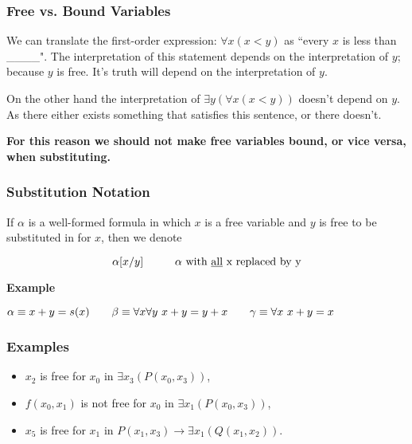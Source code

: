 \documentclass{beamer}
\theoremstyle{indentDefn} \newtheorem{defn}[]{Definition}
\begin{document}
\begin{frame}
	\frametitle{Free vs. Bound Variables}
	
	We can translate the first-order expression: $\forall x (x < y)$ as ``every $x$ is less than \_\_\_\_". The interpretation of this statement depends on the interpretation of $y$; because $y$ is free. It's truth will depend on the interpretation of $y$.
	
	\vspace{0.5cm} 
	
	On the other hand the interpretation of $\exists y (\forall x (x < y))$ doesn't depend on $y$. As there either exists something that satisfies this sentence, or there doesn't. 
	
	\vspace{0.5cm}

	{\bf For this reason we should not make free variables bound, or vice versa, when substituting.}
	
	
\end{frame}

\begin{frame}
	\frametitle{Substitution Notation}

	If $\alpha$ is a well-formed formula in which $x$ is a free variable and $y$ is free to be substituted in for $x$, then we denote 

	$$\alpha[x/y] \hspace{10mm} \alpha\text{ with \underline{all} x replaced by y}$$

	\textbf{Example}

	$\alpha \equiv x + y = s(x) \hspace{7mm} \beta \equiv \forall x \forall y \ x + y = y + x \hspace{7mm} \gamma \equiv \forall x \ x + y = x$

	\vspace{40mm}


\end{frame}

\begin{frame}
	\frametitle{Examples}

	\begin{itemize}
		\item[]	$x_{2}$ is free for $x_{0}$ in $\exists x_{3} (P(x_{0},x_{3}))$, \vspace{0.2cm}
		\item[] $f(x_{0},x_{1})$ is not free for $x_{0}$ in $\exists x_{1} (P(x_{0},x_{3}))$, \vspace{0.2cm}
		\item[] $x_{5}$ is free for $x_{1}$ in $P(x_{1},x_{3})\rightarrow \exists x_{1} (Q(x_{1},x_{2}))$.
	\end{itemize}	
		
\end{frame}
\end{document}
